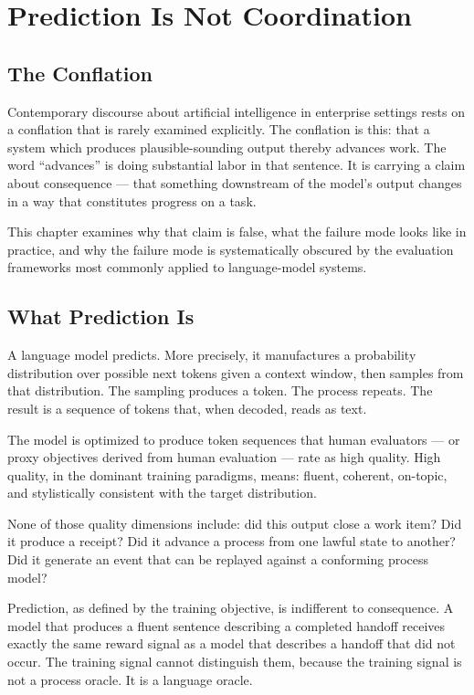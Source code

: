 \chapter{Prediction Is Not Coordination}
\label{chap:prediction_not_coordination}

\section{The Conflation}

Contemporary discourse about artificial intelligence in enterprise settings rests on a conflation that is rarely examined explicitly. The conflation is this: that a system which produces plausible-sounding output thereby advances work. The word ``advances'' is doing substantial labor in that sentence. It is carrying a claim about consequence --- that something downstream of the model's output changes in a way that constitutes progress on a task.

This chapter examines why that claim is false, what the failure mode looks like in practice, and why the failure mode is systematically obscured by the evaluation frameworks most commonly applied to language-model systems.

\section{What Prediction Is}

A language model predicts. More precisely, it manufactures a probability distribution over possible next tokens given a context window, then samples from that distribution. The sampling produces a token. The process repeats. The result is a sequence of tokens that, when decoded, reads as text.

The model is optimized to produce token sequences that human evaluators --- or proxy objectives derived from human evaluation --- rate as high quality. High quality, in the dominant training paradigms, means: fluent, coherent, on-topic, and stylistically consistent with the target distribution.

None of those quality dimensions include: did this output close a work item? Did it produce a receipt? Did it advance a process from one lawful state to another? Did it generate an event that can be replayed against a conforming process model?

Prediction, as defined by the training objective, is indifferent to consequence. A model that produces a fluent sentence describing a completed handoff receives exactly the same reward signal as a model that describes a handoff that did not occur. The training signal cannot distinguish them, because the training signal is not a process oracle. It is a language oracle.

